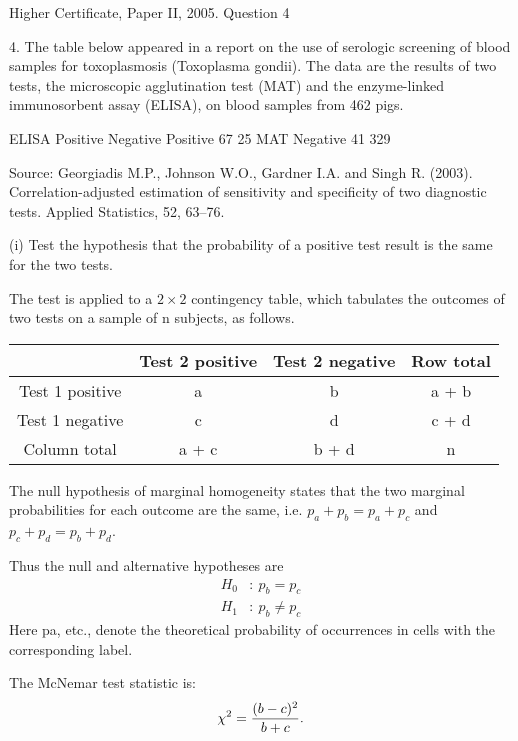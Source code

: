 \documentclass[a4paper,12pt]{article}
\begin{document}
Higher Certificate, Paper II, 2005. Question 4
\begin{framed}


4. The table below appeared in a report on the use of serologic screening of blood samples for toxoplasmosis (Toxoplasma gondii).  The data are the results of two tests, the microscopic agglutination test (MAT) and the enzyme-linked immunosorbent assay (ELISA), on blood samples from 462 pigs. 
 
  ELISA   Positive Negative Positive 67   25 MAT Negative 41 329 
 
Source:  Georgiadis M.P., Johnson W.O., Gardner I.A. and Singh R. (2003).  Correlation-adjusted estimation of sensitivity and specificity of two diagnostic tests.  Applied Statistics, 52, 63–76. 
 
 
(i) Test the hypothesis that the probability of a positive test result is the same for the two tests.  
 
\end{framed}
The test is applied to a $2 \times 2 $ contingency table, which tabulates the outcomes of two tests on a sample of n subjects, as follows. 

\begin{center}
\begin{tabular}{|c|c|c|c|}
  & Test 2 positive &  Test 2 negative & Row total   \\ \hline
Test 1 positive &  a & b & a + b  \\ \hline
Test 1 negative & c & d & c + d   \\ \hline
Column total & a + c & b + d & n   \\ \hline
\end{tabular}
\end{center}

The null hypothesis of marginal homogeneity states that the two marginal probabilities for each outcome are the same, i.e. $p_a + p_b = p_a + p_c$ and $p_c + p_d = p_b + p_d$. 

Thus the null and alternative hypotheses are         \[{\displaystyle {\begin{aligned}H_{0}&:~p_{b}=p_{c}\\H_{1}&:~p_{b}\neq p_{c}\end{aligned}}}  \]
Here pa, etc., denote the theoretical probability of occurrences in cells with the corresponding label. 

The McNemar test statistic is: 
\[ {\displaystyle \chi ^{2}={(b-c)^{2} \over b+c}.}  \]
\end{document}
